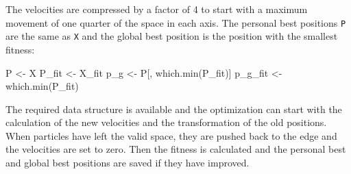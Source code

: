 \documentclass[
  oneside]{book}
\newenvironment{Shaded}{\begin{snugshade}}{\end{snugshade}}
\newcommand{\FunctionTok}[1]{\textcolor[rgb]{0.00,0.00,0.00}{#1}}
\newcommand{\NormalTok}[1]{#1}
\newcommand{\OtherTok}[1]{\textcolor[rgb]{0.56,0.35,0.01}{#1}}
\begin{document}
The velocities are compressed by a factor of 4 to start with a maximum movement of one quarter of the space in each axis. The personal best positions \texttt{P} are the same as \texttt{X} and the global best position is the position with the smallest fitness:

\begin{Shaded}
\begin{Highlighting}[]
\NormalTok{P }\OtherTok{\textless{}{-}}\NormalTok{ X}
\NormalTok{P\_fit }\OtherTok{\textless{}{-}}\NormalTok{ X\_fit}
\NormalTok{p\_g }\OtherTok{\textless{}{-}}\NormalTok{ P[, }\FunctionTok{which.min}\NormalTok{(P\_fit)]}
\NormalTok{p\_g\_fit }\OtherTok{\textless{}{-}} \FunctionTok{which.min}\NormalTok{(P\_fit)}
\end{Highlighting}
\end{Shaded}

The required data structure is available and the optimization can start with the calculation of the new velocities and the transformation of the old positions. When particles have left the valid space, they are pushed back to the edge and the velocities are set to zero. Then the fitness is calculated and the personal best and global best positions are saved if they have improved.
\end{document}
